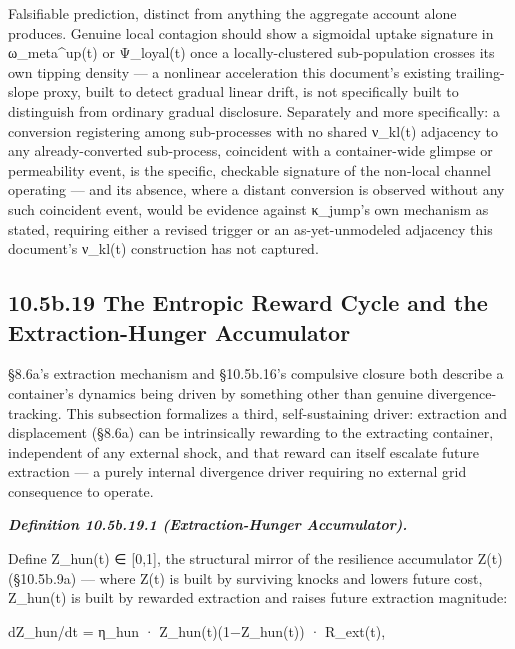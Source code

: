 \documentclass[
]{article}
\begin{document}
Falsifiable prediction, distinct from anything the aggregate account
alone produces. Genuine local contagion should show a sigmoidal uptake
signature in ω\_meta\^{}up(t) or Ψ\_loyal(t) once a locally-clustered
sub-population crosses its own tipping density  ---  a nonlinear
acceleration this document's existing trailing-slope proxy, built to
detect gradual linear drift, is not specifically built to distinguish
from ordinary gradual disclosure. Separately and more specifically: a
conversion registering among sub-processes with no shared ν\_kl(t)
adjacency to any already-converted sub-process, coincident with a
container-wide glimpse or permeability event, is the specific,
checkable signature of the non-local channel operating  ---  and its
absence, where a distant conversion is observed without any such
coincident event, would be evidence against κ\_jump's own mechanism as
stated, requiring either a revised trigger or an as-yet-unmodeled
adjacency this document's ν\_kl(t) construction has not captured.

\hypertarget{b.19-the-entropic-reward-cycle-and-the-extraction-hunger-accumulator}{%
\subsection{10.5b.19 The Entropic Reward Cycle and the Extraction-Hunger
Accumulator}\label{b.19-the-entropic-reward-cycle-and-the-extraction-hunger-accumulator}}

§8.6a's extraction mechanism and §10.5b.16's compulsive closure both
describe a container's dynamics being driven by something other than
genuine divergence-tracking. This subsection formalizes a third,
self-sustaining driver: extraction and displacement (§8.6a) can be
intrinsically rewarding to the extracting container, independent of any
external shock, and that reward can itself escalate future extraction
--- a purely internal divergence driver requiring no external grid
consequence to operate.

\emph{\textbf{Definition 10.5b.19.1 (Extraction-Hunger Accumulator).}}

Define Z\_hun(t) ∈ {[}0,1{]}, the structural mirror of the resilience
accumulator Z(t) (§10.5b.9a) --- where Z(t) is built by surviving knocks
and lowers future cost, Z\_hun(t) is built by rewarded extraction and
raises future extraction magnitude:

dZ\_hun/dt = η\_hun · Z\_hun(t)(1−Z\_hun(t)) · R\_ext(t),
\end{document}
